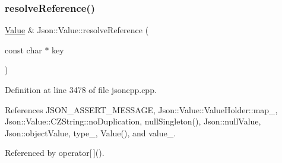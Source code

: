\subsubsection{\texorpdfstring{resolve\+Reference()}{resolveReference()}\hspace{0.1cm}{\footnotesize\ttfamily [1/2]}}
{\footnotesize\ttfamily \hyperlink{class_json_1_1_value}{Value} \& Json\+::\+Value\+::resolve\+Reference (\begin{DoxyParamCaption}\item[{const char $\ast$}]{key }\end{DoxyParamCaption})\hspace{0.3cm}{\ttfamily [private]}}



Definition at line 3478 of file jsoncpp.\+cpp.



References J\+S\+O\+N\+\_\+\+A\+S\+S\+E\+R\+T\+\_\+\+M\+E\+S\+S\+A\+GE, Json\+::\+Value\+::\+Value\+Holder\+::map\+\_\+, Json\+::\+Value\+::\+C\+Z\+String\+::no\+Duplication, null\+Singleton(), Json\+::null\+Value, Json\+::object\+Value, type\+\_\+, Value(), and value\+\_\+.



Referenced by operator\mbox{[}$\,$\mbox{]}().


